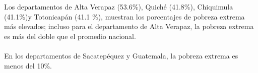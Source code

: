 Los departamentos de Alta Verapaz (53.6\%), Quiché (41.8\%), Chiquimula (41.1\%)y Totonicapán (41.1 \%), muestran los porcentajes de pobreza extrema más elevados;  incluso para el departamento de Alta Verapaz, la pobreza extrema es más del doble que el promedio nacional.  \\\\ 
En los departamentos de Sacatepéquez y Guatemala, la pobreza extrema es menos del 10\%.